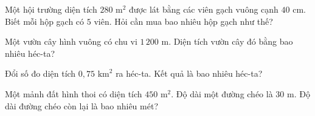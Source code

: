 \begin{ex} %
Một hội trường diện tích $280\text{ m}^2$ được lát bằng các viên gạch vuông cạnh $40\text{ cm}$. Biết mỗi hộp gạch có $5$ viên. Hỏi cần mua bao nhiêu hộp gạch như thế?
\end{ex}

\begin{ex} %
Một vườn cây hình vuông có chu vi $1\,200\text{ m}$. Diện tích vườn cây đó bằng bao nhiêu héc-ta?
\end{ex}

\begin{ex} %
Đổi số đo diện tích $0{,}75\text{ km}^2$ ra héc-ta. Kết quả là bao nhiêu héc-ta?
\end{ex}

\begin{ex} %
Một mảnh đất hình thoi có diện tích $450\text{ m}^2$. Độ dài một đường chéo là $30\text{ m}$. Độ dài đường chéo còn lại là bao nhiêu mét?
\end{ex}
